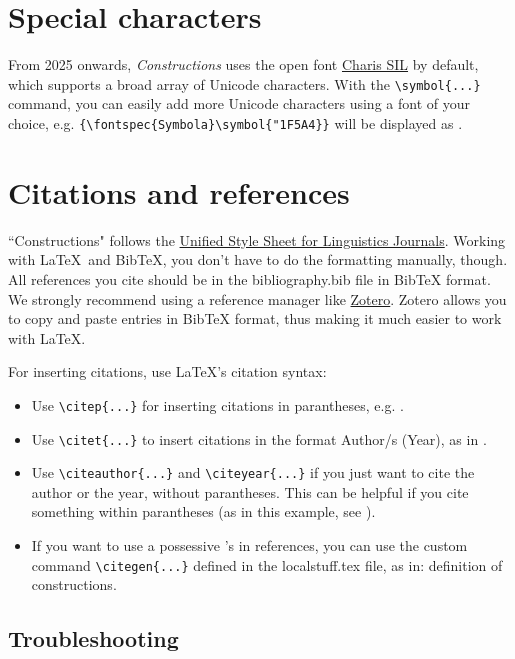 \normalfont

\section{Special characters}

From 2025 onwards, \textit{Constructions} uses the open font \href{https://software.sil.org/charis/}{Charis SIL} by default, which supports a broad array of Unicode characters. With the \verb!\symbol{...}! command, you can easily add more Unicode characters using a font of your choice, e.g. \verb!{\fontspec{Symbola}\symbol{"1F5A4}}! will be displayed as {}. 

\section{Citations and references}

``Constructions" follows the \href{https://www.linguisticsociety.org/resource/unified-style-sheet}{Unified Style Sheet for Linguistics Journals}. Working with \LaTeX \  and BibTeX, you don't have to do the formatting manually, though. All references you cite should be in the bibliography.bib file in BibTeX format. We strongly recommend using a reference manager like \href{https://www.zotero.org/}{Zotero}. Zotero allows you to copy and paste entries in BibTeX format, thus making it much easier to work with \LaTeX. 

For inserting citations, use \LaTeX's citation syntax:

\begin{itemize}
    \item Use \verb!\citep{...}! for inserting citations in parantheses, e.g. \citep{Example2}.
    \item Use \verb!\citet{...}! to insert citations in the format Author/s (Year), as in \citet{Example2}.
    \item Use \verb!\citeauthor{...}! and \verb!\citeyear{...}! if you just want to cite the author or the year, without parantheses. This can be helpful if you cite something within parantheses (as in this example, see \citeauthor{Example1} \citeyear{Example1}).
    \item If you want to use a possessive 's in references, you can use the custom command \verb!\citegen{...}! defined in the localstuff.tex file, as in:  definition of constructions.
\end{itemize}

\subsection*{Troubleshooting}

